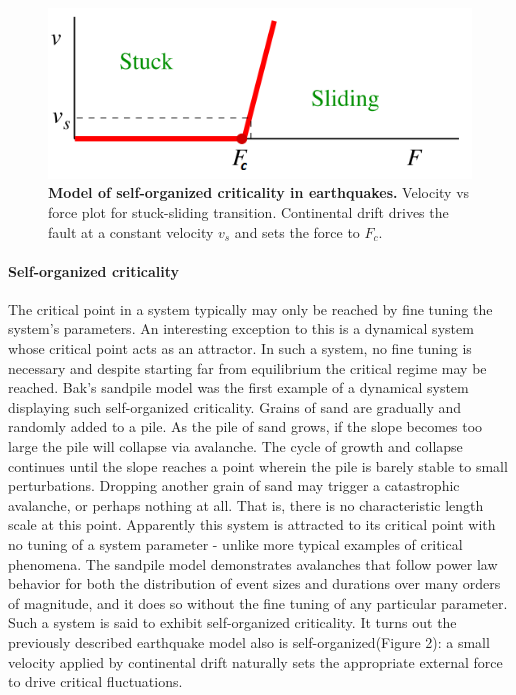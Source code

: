\documentclass[12pt]{article}
\begin{document}
\begin{figure}      
  \begin{center}    
 \includegraphics[width=.50\textwidth]{sethnaSSquakes}    
    \caption{\textbf{Model of self-organized criticality in earthquakes.} Velocity vs force plot for stuck-sliding transition. Continental drift drives the fault at a constant velocity $v_{s}$ and sets the force to $F_{c}$. \cite{Sethna2011a}}
   \label{Figure::Power law behavior in earthquakes}   
  \end{center}     
   \end{figure}

\paragraph{Self-organized criticality}

The critical point in a system typically may only be reached by fine tuning the system's parameters. An interesting exception to this is a dynamical system whose critical point acts as an attractor. In such a system, no fine tuning is necessary and despite starting far from equilibrium the critical regime may be reached. Bak's sandpile model\cite{Bak1987a} was the first example of a dynamical system displaying such self-organized criticality. Grains of sand are gradually and randomly added to a pile. As the pile of sand grows, if the slope becomes too large the pile will collapse via avalanche. The cycle of growth and collapse continues until the slope reaches a point wherein the pile is barely stable to small perturbations. Dropping another grain of sand may trigger a catastrophic avalanche, or perhaps nothing at all. That is, there is no characteristic length scale at this point. Apparently this system is attracted to its critical point with no tuning of a system parameter - unlike more typical examples of critical phenomena. The sandpile model demonstrates avalanches that follow power law behavior for both the distribution of event sizes and durations over many orders of magnitude, and it does so without the fine tuning of any particular parameter. Such a system is said to exhibit self-organized criticality. It turns out the previously described earthquake model also is self-organized(Figure 2): a small velocity applied by continental drift naturally sets the appropriate external force to drive critical fluctuations\cite{Sethna2011a}.
\end{document}
